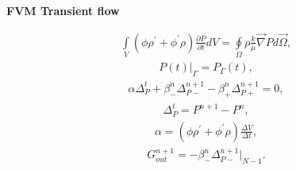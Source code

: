\documentclass[a4paper,12pt]{extreport}
\begin{document}
\begin{multicols}{2}
        \columnbreak
        \begin{center}
        {\large \textbf{FVM Transient flow}}
        \end{center}
        \begin{eqnarray}
            \label{eq:conductivity_integral}
            \int \limits_{V} \left( \phi \rho^\prime + \phi^\prime \rho \right) \frac{\partial P}{\partial t} d V = \oint \limits_{\Omega} \rho \frac{k}{\mu} \vec{\nabla}P d\vec{\Omega},
        \end{eqnarray}
       \vspace{-0.5cm}
        \begin{eqnarray}
            \label{eq:conductivity_bound}
            P\left(t\right) \Big|_\Gamma = P_\Gamma\left(t\right),
        \end{eqnarray}
        \begin{eqnarray}
            \label{eq:conductivity_num}
            \alpha \Delta^{t}_{P} + \beta^n_{-}\Delta^{n+1}_{P-} - \beta^n_{+}\Delta^{n+1}_{P+}= 0,
        \end{eqnarray}
        \begin{eqnarray}
            \label{eq:delta_P_t_num}
            \Delta^{t}_{P} = P^{n+1} - P^{n},
        \end{eqnarray}
        \begin{eqnarray}
            \label{eq:alpha}
            \alpha = \left( \phi \rho^\prime + \phi^\prime \rho \right) \frac{\Delta V}{\Delta t},
        \end{eqnarray}
        \begin{eqnarray}
            \label{eq:Consumption_conductivity_integral}
            G_{out}^{n+1} = - \beta^n_-\Delta^{n+1}_{P-} \Big|_ {N-1}.                        
        \end{eqnarray}
    \end{multicols}

    \vspace{1.cm}
\end{document}
